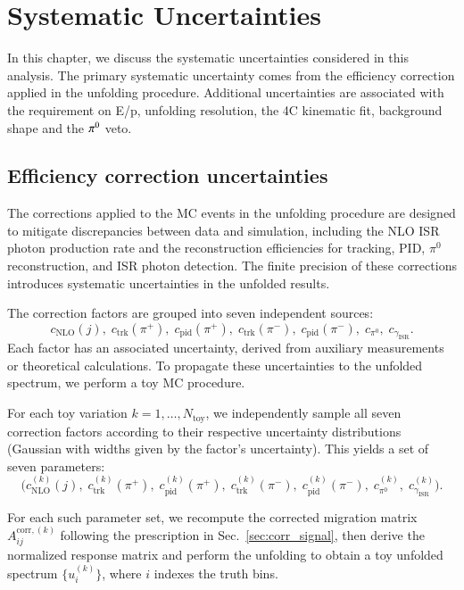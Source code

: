 \clearpage
\section{Systematic Uncertainties}
\label{sec:sysU}

In this chapter, we discuss the systematic uncertainties considered in this analysis. The primary systematic uncertainty comes from the efficiency correction applied in the unfolding procedure. Additional uncertainties are associated with the requirement on E/p, unfolding resolution, the 4C kinematic fit, background shape and the $\pi^{0}$ veto.

\subsection{Efficiency correction uncertainties}
\label{sec:eff_sys}

The corrections applied to the MC events in the unfolding procedure are designed to mitigate discrepancies between data and simulation, including the NLO ISR photon production rate and the reconstruction efficiencies for tracking, PID, $\pi^0$ reconstruction, and ISR photon detection. The finite precision of these corrections introduces systematic uncertainties in the unfolded results.

The correction factors are grouped into seven independent sources:
\[
c_{\text{NLO}}(j),\; c_{\text{trk}}(\pi^+),\; c_{\text{pid}}(\pi^+),\; c_{\text{trk}}(\pi^-),\; c_{\text{pid}}(\pi^-),\; c_{\pi^0},\; c_{\gamma_{\text{ISR}}}.
\]
Each factor has an associated uncertainty, derived from auxiliary measurements or theoretical calculations. To propagate these uncertainties to the unfolded spectrum, we perform a toy MC procedure.

For each toy variation $k = 1, \dots, N_{\text{toy}}$, we independently sample all seven correction factors according to their respective uncertainty distributions (Gaussian with widths given by the factor's uncertainty). This yields a set of seven parameters:
\[
\bigl( c_{\text{NLO}}^{(k)}(j),\; c_{\text{trk}}^{(k)}(\pi^+),\; c_{\text{pid}}^{(k)}(\pi^+),\; c_{\text{trk}}^{(k)}(\pi^-),\; c_{\text{pid}}^{(k)}(\pi^-),\; c_{\pi^0}^{(k)},\; c_{\gamma_{\text{ISR}}}^{(k)} \bigr).
\]

For each such parameter set, we recompute the corrected migration matrix $A_{ij}^{\text{corr},(k)}$ following the prescription in Sec.~\ref{sec:corr_signal}, then derive the normalized response matrix and perform the unfolding to obtain a toy unfolded spectrum $\{ u_i^{(k)} \}$, where $i$ indexes the truth bins.

